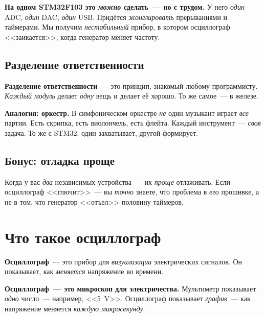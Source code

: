 \begin{warnbox}
\textbf{На одном STM32F103 это \emph{можно} сделать~--- но
с трудом.} У него \emph{один} ADC, \emph{один} DAC,
\emph{один} USB. Придётся \emph{жонглировать} прерываниями
и таймерами. Мы получим \emph{нестабильный} прибор,
в котором осциллограф <<заикается>>, когда генератор меняет
частоту.
\end{warnbox}

\subsection{Разделение ответственности}

\textbf{Разделение ответственности}~--- это принцип, знакомый
любому программисту. \emph{Каждый модуль} делает \emph{одну}
вещь и делает её хорошо. То же самое~--- в железе.

\begin{ideabox}
\textbf{Аналогия: оркестр.} В симфоническом оркестре \emph{не}
один музыкант играет \emph{все} партии. Есть скрипка, есть
виолончель, есть флейта. Каждый инструмент~--- \emph{своя}
задача. То же с STM32: один захватывает, другой формирует.
\end{ideabox}

\subsection{Бонус: отладка проще}

Когда у вас \emph{два} независимых устройства~--- их
\emph{проще} отлаживать. Если осциллограф <<глючит>>~---
вы \emph{точно} знаете, что проблема в \emph{его} прошивке,
а не в том, что генератор <<отъел>> половину таймеров.

\section{Что такое осциллограф}
\label{sec:intro-oscilloscope}

\textbf{Осциллограф}~--- это прибор для \emph{визуализации}
электрических сигналов. Он показывает, как \emph{меняется}
напряжение во времени.

\begin{keybox}
\textbf{Осциллограф~--- это микроскоп для электричества.}
Мультиметр показывает \emph{одно} число~--- например,
<<\SI{5}{\volt}>>. Осциллограф показывает \emph{график}~---
как напряжение меняется \emph{каждую микросекунду}.
\end{keybox}

